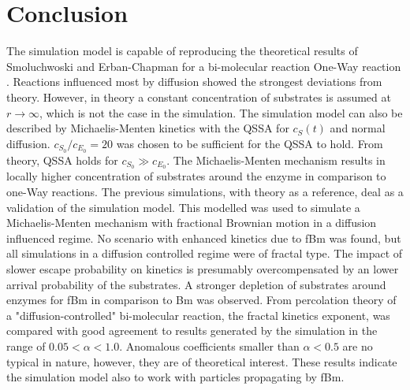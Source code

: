 \documentclass[
  a4paper,BCOR10mm,twoside,
  headsepline,footsepline,%
  fleqn,openbib
]{scrbook}
\begin{document}
\section{Conclusion}
The simulation model is capable of reproducing the theoretical results of Smoluchwoski and Erban-Chapman for a bi-molecular reaction One-Way reaction . Reactions influenced most by diffusion showed the strongest deviations from theory. However, in theory a constant concentration of substrates is assumed at $r\rightarrow \infty$, which is not the case in the simulation. The simulation model can also be described by Michaelis-Menten kinetics with the QSSA for $c_S(t)$ and normal diffusion. $c_{S_0}/c_{E_0}=20$ was chosen to be sufficient for the QSSA to hold. From theory, QSSA holds for $c_{S_0}\gg c_{E_0}$. The Michaelis-Menten mechanism results in locally higher concentration of substrates around the enzyme in comparison to one-Way reactions. The previous simulations, with theory as a reference, deal as a validation of the simulation model. This modelled was  used to simulate a Michaelis-Menten mechanism with fractional Brownian motion in a diffusion influenced regime. No scenario with enhanced kinetics due to fBm was found, but all simulations in a diffusion controlled regime were of fractal type. The impact of slower escape probability on kinetics is presumably overcompensated by an lower arrival probability of the substrates.  A stronger depletion of substrates around enzymes for fBm in comparison to Bm was observed. From percolation theory of a "diffusion-controlled" bi-molecular reaction, the fractal kinetics exponent, was compared with good agreement to results generated by the simulation in the range of $0.05<\alpha<1.0$. Anomalous coefficients smaller than $\alpha<0.5$ are no typical in nature, however, they are of theoretical interest. These results indicate the simulation model also to work with particles propagating by fBm. 

\end{document}
